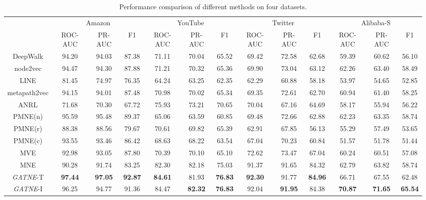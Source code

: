 \documentclass[sigconf]{acmart}
\newcommand{\company}{Alibaba}
\newcommand{\model}{{\em GATNE}}
\newcommand{\hide}[1]{} \newcommand{\jie}[1]{\textbf{\color{red}[(JT: #1 )]}}  \newcommand{\vpara}[1]{\vspace{0.07in}\noindent\textbf{#1 }}
\begin{document}
\begin{table*}
	\centering
	\small
	\setlength{\abovecaptionskip}{10pt}
\caption{\label{tab:tab_res}Performance comparison of different methods on four datasets. \hide{We use \textbf{bold} to highlight methods that surpass all other compared methods.}}
	\begin{tabular}{c|ccc|ccc|ccc|ccc}
		\hline \hline
		& \multicolumn{3}{c|}{Amazon} & \multicolumn{3}{c|}{YouTube} & \multicolumn{3}{c|}{Twitter} & \multicolumn{3}{c}{\company-S} \\
		& ROC-AUC & PR-AUC & F1 & ROC-AUC & PR-AUC & F1 & ROC-AUC & PR-AUC & F1 & ROC-AUC & PR-AUC & F1 \\
		\hline
		DeepWalk & 94.20 & 94.03 & 87.38 & 71.11 & 70.04 & 65.52 & 69.42 & 72.58 & 62.68 & 59.39 & 60.62 & 56.10 \\
		node2vec & 94.47 & 94.30 & 87.88 & 71.21 & 70.32 & 65.36 & 69.90 & 73.04 & 63.12 & 62.26 & 63.40 & 58.49 \\
		LINE & 81.45 & 74.97 & 76.35 & 64.24 & 63.25 & 62.35 & 62.29 & 60.88 & 58.18 & 53.97 & 54.65 & 52.85 \\
\hline
metapath2vec & 94.15 & 94.01 & 87.48 & 70.98 & 70.02 & 65.34 & 69.35 & 72.61 & 62.70 & 60.94 & 61.40 & 58.25\\
\hline
ANRL & 71.68 & 70.30 & 67.72 & 75.93 & 73.21 & 70.65 & 70.04 & 67.16 & 64.69 & 58.17 & 55.94 & 56.22 \\
\hline
		PMNE(n) & 95.59 & 95.48 & 89.37 & 65.06 & 63.59 & 60.85 & 69.48 & 72.66 & 62.88 & 62.23 & 63.35 & 58.74 \\
		PMNE(r) & 88.38 & 88.56 & 79.67 & 70.61 & 69.82 & 65.39 & 62.91 & 67.85 & 56.13 & 55.29 & 57.49 & 53.65 \\
		PMNE(c) & 93.55 & 93.46 & 86.42 & 68.63 & 68.22 & 63.54 & 67.04 & 70.23 & 60.84 & 51.57 & 51.78 & 51.44 \\
		MVE & 92.98 & 93.05 & 87.80 & 70.39 & 70.10 & 65.10 & 72.62 & 73.47 & 67.04 & 60.24 & 60.51 & 57.08 \\
		MNE & 90.28 & 91.74 & 83.25 & 82.30 & 82.18 & 75.03 & 91.37 & 91.65 & 84.32 & 62.79 & 63.82 & 58.74 \\
		\hline
\model-T & \textbf{97.44} & \textbf{97.05} & \textbf{92.87} & \textbf{84.61} & 81.93 & \textbf{76.83} & \textbf{92.30} & 91.77 & \textbf{84.96} & 66.71 & 67.55 & 62.48 \\
		\model-I & 96.25 & 94.77 & 91.36 & 84.47 & \textbf{82.32} & \textbf{76.83} & 92.04 & \textbf{91.95} & 84.38 & \textbf{70.87} & \textbf{71.65} & \textbf{65.54}\\
		\hline \hline
	\end{tabular}
\end{table*}
\end{document}

